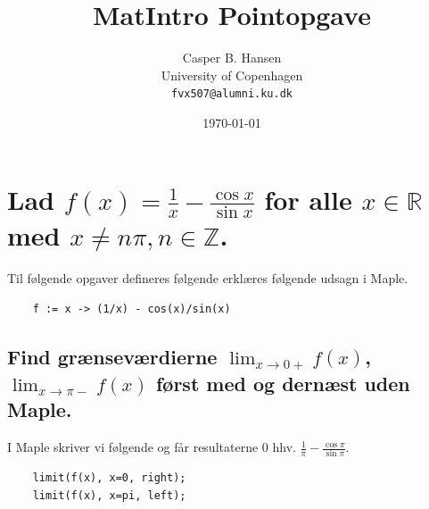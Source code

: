 \documentclass[11pt,a4paper]{article}
\title{MatIntro Pointopgave \assignmentnumber}
\author
{
    Casper B. Hansen\\
    University of Copenhagen\\
    {\tt fvx507@alumni.ku.dk}
}
\date{\today}
\newcommand{\limit}[2]{\lim_{#1 \rightarrow #2}}
\begin{document}


\section
{
    \mdseries
    Lad $f(x) = \frac{1}{x} - \frac{\cos x}{\sin x}$ for alle $x \in
    \mathbb{R}$ med $x \neq n\pi, n \in \mathbb{Z}$.
}
Til følgende opgaver defineres følgende erklæres følgende udsagn i Maple.
\begin{lstlisting}
    f := x -> (1/x) - cos(x)/sin(x)
\end{lstlisting}

\subsection
{
    \mdseries
    Find grænseværdierne $\limit{x}{0+} f(x)$, $\limit{x}{\pi-} f(x)$ først
    med og dernæst uden Maple.
}
I Maple skriver vi følgende og får resultaterne $0$ hhv. $\frac{1}{\pi} -
\frac{\cos \pi}{\sin \pi}$.
\begin{lstlisting}
    limit(f(x), x=0, right);
    limit(f(x), x=pi, left);
\end{lstlisting}
\end{document}
